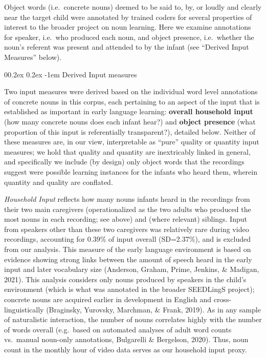 \documentclass[
  english,
  man,floatsintext]{apa6}
\makeatletter
\let\oldparagraph\paragraph
\renewcommand{\paragraph}[1]{\oldparagraph{#1}\mbox{}}
\renewcommand{\paragraph}{\@startsection{paragraph}{4}{\parindent}%
  {0\baselineskip \@plus 0.2ex \@minus 0.2ex}%
  {-1em}%
  {\normalfont\normalsize\bfseries\itshape\typesectitle}}
\makeatother
\begin{document}
Object words (i.e.~concrete nouns) deemed to be said to, by, or loudly and clearly near the target child were annotated by trained coders for several properties of interest to the broader project on noun learning. Here we examine annotations for speaker, i.e.~who produced each noun, and object presence, i.e.~whether the noun's referent was present and attended to by the infant (see ``Derived Input Measures'' below).

\hypertarget{derived-input-measures}{%
\paragraph{Derived Input measures}\label{derived-input-measures}}

Two input measures were derived based on the individual word level annotations of concrete nouns in this corpus, each pertaining to an aspect of the input that is established as important in early language learning: \textbf{overall household input} (how many concrete nouns does each infant hear?) and \textbf{object presence} (what proportion of this input is referentially transparent?), detailed below. Neither of these measures are, in our view, interpretable as ``pure'' quality or quantity input measures; we hold that quality and quantity are inextricably linked in general, and specifically we include (by design) only object words that the recordings suggest were possible learning instances for the infants who heard them, wherein quantity and quality are conflated.

\emph{Household Input} reflects how many nouns infants heard in the recordings from their two main caregivers (operationalized as the two adults who produced the most nouns in each recording; see above) and (where relevant) siblings. Input from speakers other than these two caregivers was relatively rare during video recordings, accounting for 0.39\% of input overall (SD=2.37\%), and is excluded from our analysis. This measure of the early language environment is based on evidence showing strong links between the amount of speech heard in the early input and later vocabulary size (Anderson, Graham, Prime, Jenkins, \& Madigan, 2021). This analysis considers only nouns produced by speakers in the child's environment (which is what was annotated in the broader SEEDLingS project); concrete nouns are acquired earlier in development in English and cross-linguistically (Braginsky, Yurovsky, Marchman, \& Frank, 2019). As in any sample of naturalistic interaction, the number of nouns correlates highly with the number of words overall (e.g.~based on automated analyses of adult word counts vs.~manual noun-only annotations, Bulgarelli \& Bergelson, 2020). Thus, noun count in the monthly hour of video data serves as our household input proxy.
\end{document}
